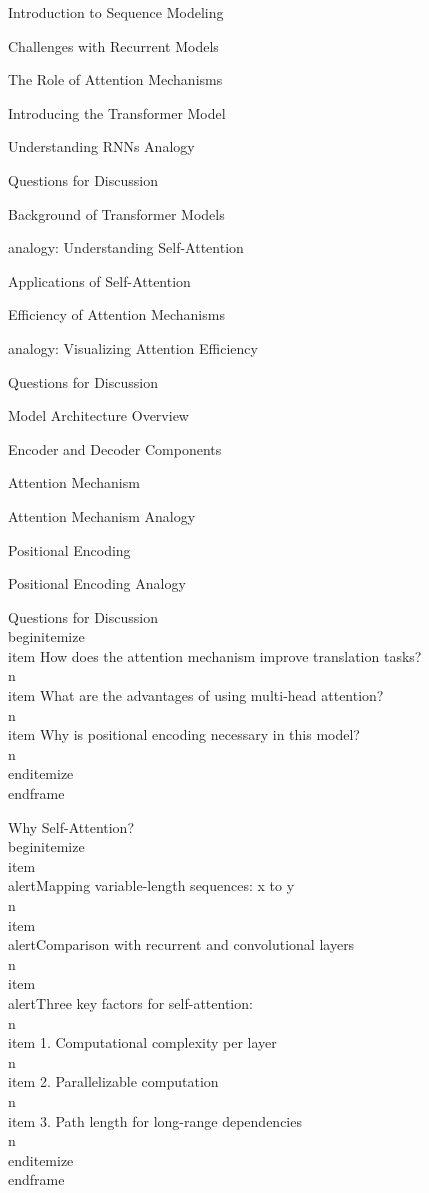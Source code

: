 \documentclass{beamer}
\begin{document}
\begin{frame}[]{Introduction to Sequence Modeling}
\begin{frame}[]{Challenges with Recurrent Models}
\begin{frame}[]{The Role of Attention Mechanisms}
\begin{frame}[]{Introducing the Transformer Model}
\begin{frame}[plain]{Understanding RNNs Analogy}
\begin{frame}[]{Questions for Discussion}
\begin{frame}[]{Background of Transformer Models}
\begin{frame}[plain]{analogy: Understanding Self-Attention}
\begin{frame}[]{Applications of Self-Attention}
\begin{frame}[]{Efficiency of Attention Mechanisms}
\begin{frame}[plain]{analogy: Visualizing Attention Efficiency}
\begin{frame}[]{Questions for Discussion}
\begin{frame}[]{Model Architecture Overview}
\begin{frame}[]{Encoder and Decoder Components}
\begin{frame}[]{Attention Mechanism}
\begin{frame}[plain]{Attention Mechanism Analogy}
\begin{frame}[]{Positional Encoding}
\begin{frame}[plain]{Positional Encoding Analogy}
\begingroup
{}\n{}\n\begin{frame}[]{Questions for Discussion}\n\\begin{itemize}
\\item How does the attention mechanism improve translation tasks?\\n\\item What are the advantages of using multi-head attention?\\n\\item Why is positional encoding necessary in this model?\\n\\end{itemize}
\\end{frame}

\endgroup

\begingroup
{}\n{}\n\begin{frame}[]{Why Self-Attention?}\n\\begin{itemize}
\\item \\alert{Mapping variable-length sequences: x to y}\\n\\item \\alert{Comparison with recurrent and convolutional layers}\\n\\item \\alert{Three key factors for self-attention:}\\n\\item 1. Computational complexity per layer\\n\\item 2. Parallelizable computation\\n\\item 3. Path length for long-range dependencies\\n\\end{itemize}
\\end{frame}

\endgroup


\end{frame}
\end{frame}
\end{frame}
\end{frame}
\end{frame}
\end{frame}
\end{frame}
\end{frame}
\end{frame}
\end{frame}
\end{frame}
\end{frame}
\end{frame}
\end{frame}
\end{frame}
\end{frame}
\end{frame}
\end{frame}
\end{frame}
\end{frame}
\end{document}
